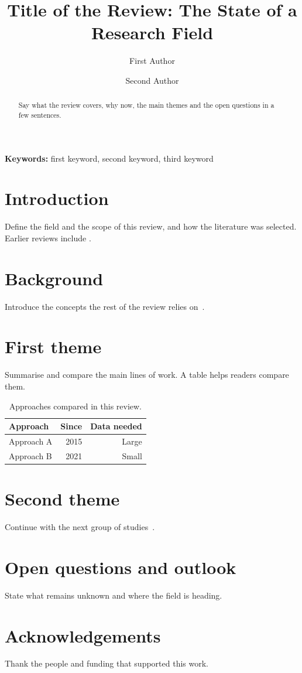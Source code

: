 \documentclass[11pt,a4paper]{article}
\title{Title of the Review: The State of a Research Field}
\author[1]{First Author}
\author[2]{Second Author}
\affil[1]{Department, University, City, Country}
\affil[2]{Institute, City, Country}
\date{}
\begin{document}
\maketitle

\begin{abstract}
Say what the review covers, why now, the main themes and the open questions in
a few sentences.
\end{abstract}

\noindent\textbf{Keywords:} first keyword, second keyword, third keyword

\section{Introduction}
Define the field and the scope of this review, and how the literature was
selected. Earlier reviews include \citet{lecun2015deep}.

\section{Background}
Introduce the concepts the rest of the review relies on~\citep{shannon1948}.

\section{First theme}
Summarise and compare the main lines of work. A table helps readers compare them.

\begin{table}[htbp]
  \centering
  \caption{Approaches compared in this review.}
  \label{tab:approaches}
  \begin{tabular}{lrr}
    \toprule
    Approach & Since & Data needed \\
    \midrule
    Approach A & 2015 & Large \\
    Approach B & 2021 & Small \\
    \bottomrule
  \end{tabular}
\end{table}

\section{Second theme}
Continue with the next group of studies~\citep{he2016deep,vaswani2017attention}.

\section{Open questions and outlook}
State what remains unknown and where the field is heading.

\section*{Acknowledgements}
Thank the people and funding that supported this work.



\end{document}
